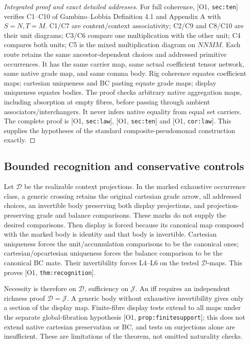 \documentclass[11pt,a4paper]{article}
\theoremstyle{definition}
\newcommand{\J}{\mathcal J}
\newcommand{\Addr}[2]{\textup{[#1, \texttt{#2}]}}
\begin{document}
\begin{proof}[Integrated proof and exact detailed addresses]
For full coherence, \Addr{O1}{sec:ten} verifies C1--C10 of
Gambino--Lobbia Definition 4.1 and Appendix A with \(S=N,T=M\).
C1/C7 are content/context associativity; C2/C9 and C8/C10 are their
unit diagrams; C3/C6 compare one multiplication with the other unit;
C4 compares both units; C5 is the mixed multiplication diagram on
\(NNMM\). Each route retains the same ancestor-dependent choices
and addressed primitive occurrences. It has the same carrier map,
same actual coefficient tensor network, same native grade map, and same
comma body. Rig coherence equates coefficient maps; cartesian uniqueness
and BC pasting equate grade maps; display uniqueness equates bodies.
The proof checks arbitrary native aggregation maps, including absorption
at empty fibres, before passing through ambient associators/interchangers.
It never infers native equality from equal set carriers. The complete
proof is \Addr{O1}{sec:law}, \Addr{O1}{sec:ten} and
\Addr{O1}{cor:law}. This supplies the hypotheses of the standard
composite-pseudomonad construction exactly.
\end{proof}

\subsection{Bounded recognition and conservative controls}
Let \(\mathcal D\) be the realizable context projections. In the marked
exhaustive occurrence class, a generic crossing retains the original
cartesian grade arrow, all addressed choices, an invertible body
preserving both display projections, and projection-preserving grade and
balance comparisons. These marks do not supply the desired comparisons.
Then display is forced because its canonical map composed with the
marked body is identity and that body is invertible. Cartesian uniqueness
forces the unit/accumulation comparisons to be the canonical ones;
cartesian/opcartesian uniqueness forces the balance comparison to be the
canonical BC mate. Their invertibility forces L4--L6 on the tested
\(\mathcal D\)-maps. This proves \Addr{O1}{thm:recognition}.

Necessity is therefore on \(\mathcal D\), sufficiency on \(\J\).
An iff requires an independent richness proof \(\mathcal D=\J\).
A generic body without exhaustive invertibility gives only a section of
the display map. Finite-fibre display tests extend to all maps under the
separate global-fibration hypothesis \Addr{O1}{prop:finitesupport};
this does not extend native cartesian preservation or BC, and tests on
surjections alone are insufficient. These are limitations of the theorem,
not omitted naturality checks.
\end{document}
